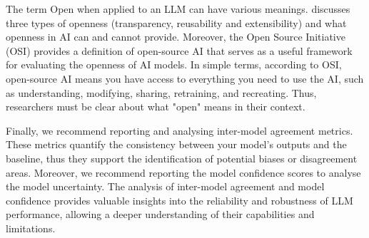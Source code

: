 The term Open when applied to an LLM can have various meanings. \cite{widder2024open} discusses three types of openness (transparency, reusability 
and extensibility) and  what openness in AI can and cannot provide. Moreover, the Open Source Initiative (OSI) \cite{OSIAI2024} provides a definition of 
open-source AI that serves as a useful framework for evaluating the openness of AI models. In simple terms, according to OSI, open-source AI means 
you have access to everything you need to use the AI, such as understanding, modifying, sharing, retraining, and recreating. Thus, researchers must 
be clear about what "open" means in their context.

Finally, we recommend reporting and analysing inter-model agreement metrics. These metrics quantify the consistency between your model's outputs 
and the baseline, thus they support the identification of potential biases or disagreement areas.  Moreover, we recommend reporting the model 
confidence scores to analyse the model uncertainty.  The analysis of inter-model agreement and model confidence provides valuable insights into 
the reliability and robustness of LLM performance, allowing a deeper understanding of their capabilities and limitations.



